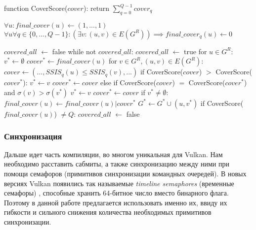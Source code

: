 \begin{minipage}[t]{0.95\textwidth}
    \centering
    \begin{pseudocode}[mathescape=true, caption={Построение графа $G^*$ с достаточным минимальным набором ребер для межочередной синхронизации}, label={lst:render_graph_cross_queue_graph}]

    function CoverScore($cover$):
        return $\sum_{q=0}^{Q-1} cover_q$

    $\forall u: final\_cover(u) \leftarrow (1, ..., 1)$
    $\forall u \forall q \in\{0, ..., Q-1\}: (\exists v: (u, v) \in E(G^R)) \implies final\_cover_q(u) \leftarrow 0$

    $covered\_all$ $\leftarrow$ false
    while not $covered\_all$:
        $covered\_all$ $\leftarrow$ true
        for $u \in G^R$:
            $v^* \leftarrow \emptyset$
            $cover^* \leftarrow final\_cover(u)$
            for $v \in G^R, (u, v) \in E(G^R)$:
                $cover \leftarrow (..., SSIS_q(u) \leq SSIS_q(v), ...)$
                if CoverScore($cover$) $>$ CoverScore($cover^*$):
                    $v^* \leftarrow v$
                    $cover^* \leftarrow cover$
                else if CoverScore($cover$) $=$ CoverScore($cover^*$) and $\sigma(v) > \sigma(v^*)$
                    $v^* \leftarrow v$
                    $cover^* \leftarrow cover$
            if $v^* \neq \emptyset$:
                $final\_cover(u) \leftarrow final\_cover(u) | cover^*$
                $G^* \leftarrow G^* \cup (u, v^*)$
            if CoverScore($final\_cover(u)$) $\neq Q$:
                $covered\_all$ $\leftarrow$ false
    \end{pseudocode}
\end{minipage}

\subsubsection{Синхронизация}
Дальше идет часть компиляции, во многом уникальная для Vulkan. Нам необходимо расставить сабмиты, а также синхронизацию между ними при помощи семафоров (примитивов синхронизации командных очередей). В новых версиях Vulkan появились так называемые \textit{timeline semaphores} (временные семафоры) \cite{vulkan_timeline_semaphore}, способные хранить 64-битное число вместо бинарного флага. Поэтому в данной работе предлагается использовать именно их, ввиду их гибкости и сильного снижения количества необходимых примитивов синхронизации.

